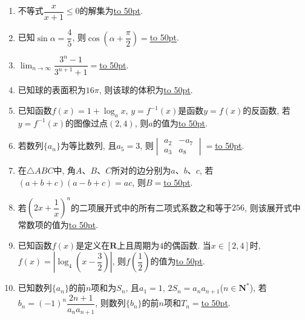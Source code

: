\documentclass[10pt,a4paper]{article}
\newcommand{\blank}[1]{\underline{\hbox to #1pt{}}}
\begin{document}
\begin{enumerate}[1.]
\item 不等式$\dfrac x{x+1}\le 0$的解集为\blank{50}.
\item 已知$\sin\alpha=\dfrac45$, 则$\cos(\alpha+\dfrac{\pi}2)=$\blank{50}.
\item $\displaystyle\lim_{n\to\infty}\dfrac{3^n-1}{3^{n+1}+1}=$\blank{50}.
\item 已知球的表面积为$16\pi$, 则该球的体积为\blank{50}.
\item 已知函数$f(x)=1+\log_a x$, $y=f^{-1}(x)$是函数$y=f(x)$的反函数, 若$y=f^{-1}(x)$的图像过点$(2,4)$, 则$a$的值为\blank{50}.
\item 若数列$\{a_n\}$为等比数列, 且$a_5=3$, 则$\begin{vmatrix} a_2 & -a_7 \\ a_3 & a_8 \end{vmatrix}=$\blank{50}.
\item 在$\triangle ABC$中, 角$A$、$B$、$C$所对的边分别为$a$、$b$、$c$, 若$(a+b+c)(a-b+c)=ac$, 则$B=$\blank{50}.
\item 若$(2x+\dfrac 1x)^n$的二项展开式中的所有二项式系数之和等于$256$, 则该展开式中常数项的值为\blank{50}.
\item 已知函数$f(x)$是定义在$\mathbf{R}$上且周期为$4$的偶函数. 当$x\in [2,4]$时, $f(x)=\left|\log_4(x-\dfrac32)\right|$, 则$f(\dfrac12)$的值为\blank{50}.
\item 已知数列$\{a_n\}$的前$n$项和为$S_n$, 且$a_1=1$, $2S_n=a_na_{n+1}$($n\in \mathbf{N}^*$), 若$b_n=(-1)^n\dfrac{2n+1}{{a_n}{a_{n+1}}}$, 则数列$\{b_n\}$的前$n$项和$T_n=$\blank{50}.



\end{enumerate}
\end{document}
